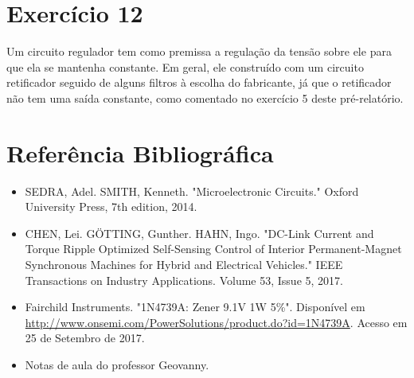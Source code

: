 \documentclass[12pt, a4paper, twoside]{article}
\begin{document}
\section{Exercício 12}

Um circuito regulador tem como premissa a regulação da tensão sobre ele para que ela se mantenha constante. Em geral, ele construído com um circuito retificador seguido de alguns filtros à escolha do fabricante, já que o retificador não tem uma saída constante, como comentado no exercício 5 deste pré-relatório.

\section{Referência Bibliográfica}

\begin{itemize}
    \item SEDRA, Adel. SMITH, Kenneth. "Microelectronic Circuits."  Oxford University Press, 7th edition, 2014.
    \item CHEN, Lei. GÖTTING, Gunther. HAHN, Ingo. "DC-Link Current and Torque Ripple Optimized Self-Sensing Control of Interior Permanent-Magnet Synchronous Machines for Hybrid and Electrical Vehicles." IEEE Transactions on Industry Applications. Volume 53, Issue 5, 2017.
    \item Fairchild Instruments. "1N4739A: Zener 9.1V 1W 5\%". Disponível em \url{http://www.onsemi.com/PowerSolutions/product.do?id=1N4739A}. Acesso em 25 de Setembro de 2017.
    \item Notas de aula do professor Geovanny.
\end{itemize}
\end{document}
